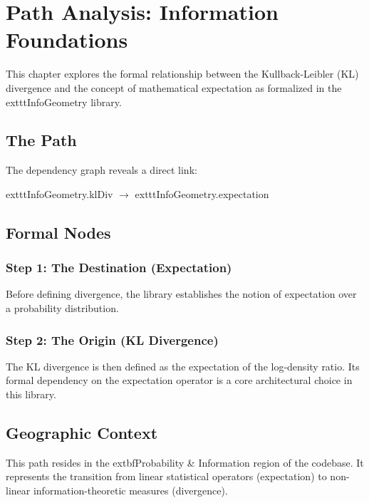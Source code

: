\chapter{Path Analysis: Information Foundations}

This chapter explores the formal relationship between the Kullback-Leibler (KL) divergence and the concept of mathematical expectation as formalized in the 	exttt{InfoGeometry} library.

\section{The Path}
The dependency graph reveals a direct link:
\begin{center}
    	exttt{InfoGeometry.klDiv} $\longrightarrow$ 	exttt{InfoGeometry.expectation}
\end{center}

\section{Formal Nodes}

\subsection{Step 1: The Destination (Expectation)}
Before defining divergence, the library establishes the notion of expectation over a probability distribution.
\begin{definition}[blueprint="infogeometry:expectation"]
\end{definition}

\subsection{Step 2: The Origin (KL Divergence)}
The KL divergence is then defined as the expectation of the log-density ratio. Its formal dependency on the expectation operator is a core architectural choice in this library.
\begin{theorem}[blueprint="infogeometry:kldiv"]
\end{theorem}

\section{Geographic Context}
This path resides in the 	extbf{Probability \& Information} region of the codebase. It represents the transition from linear statistical operators (expectation) to non-linear information-theoretic measures (divergence).
